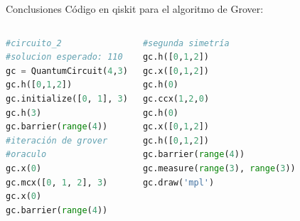 \documentclass[10pt,compress]{beamer}
\begin{document}
\begin{frame}[fragile]{Conclusiones}
Código en qiskit para el algoritmo de Grover:
\begin{columns}
\begin{lstlisting}[language=Python]
#circuito_2
#solucion esperado: 110
gc = QuantumCircuit(4,3)
gc.h([0,1,2])
gc.initialize([0, 1], 3)
gc.h(3)
gc.barrier(range(4))
#iteración de grover
#oraculo
gc.x(0)
gc.mcx([0, 1, 2], 3)
gc.x(0)
gc.barrier(range(4))
\end{lstlisting}

\begin{lstlisting}[language=Python]
#segunda simetría
gc.h([0,1,2])
gc.x([0,1,2])
gc.h(0)
gc.ccx(1,2,0)
gc.h(0)
gc.x([0,1,2])
gc.h([0,1,2])
gc.barrier(range(4))
gc.measure(range(3), range(3))
gc.draw('mpl')
\end{lstlisting}

\end{columns}
\end{frame}
\end{document}
